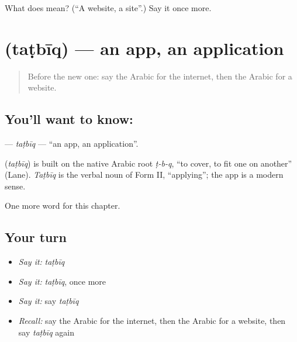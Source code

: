 \begin{tcolorbox}[breakable,colback=teal!4,colframe=teal!35!black,title={Before you move on}]
What does  mean? (\textquotedblleft{}A website, a site\textquotedblright{}.) Say it once more.
\end{tcolorbox}
\section[\texorpdfstring{\ar{تطبيق} (taṭbīq)}{تطبيق (taṭbīq)}]{ (taṭbīq) — an app, an application}

\label{lesson:AR-C248-tatbiq}



\begin{quote}
Before the new one: say the Arabic for the internet, then the Arabic for a website.
\end{quote}

\subsection*{You'll want to know: }
\textbf{} — \emph{taṭbīq} — \textquotedblleft{}an app, an application\textquotedblright{}.

\begin{cousinweb}
\textbf{} (\emph{taṭbīq}) is built on the native Arabic root \emph{ṭ-b-q}, \textquotedblleft{}to cover, to fit one on another\textquotedblright{} (Lane). \emph{Taṭbīq} is the verbal noun of Form II, \textquotedblleft{}applying\textquotedblright{}; the app is a modern sense.
\end{cousinweb}

\begin{grammarlens}[title={What you've built}]
One more word for this chapter.
\end{grammarlens}

\subsection*{Your turn}
\begin{itemize}
\raggedright
  \item \emph{Say it:} \emph{taṭbīq}
  \item \emph{Say it:} \emph{taṭbīq}, once more
  \item \emph{Say it:} say \emph{taṭbīq}
  \item \emph{Recall:} say the Arabic for the internet, then the Arabic for a website, then say \emph{taṭbīq} again
\end{itemize}

